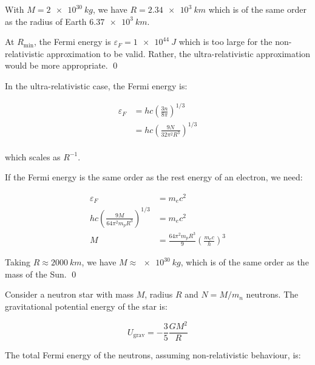 \documentclass[12pt]{article}
\begin{document}
With $M = \qty{2e30}{kg}$, we have $R = \qty{2.34e3}{km}$ which is of the same order as the radius of Earth $\qty{6.37e3}{km}$.

At $R_{\text{min}}$, the Fermi energy is $\varepsilon_{F} = \qty{1e44}{J}$ which is too large for the non-relativistic approximation to be valid. Rather, the ultra-relativistic approximation would be more appropriate.
\qed



In the ultra-relativistic case, the Fermi energy is:

\begin{equation}
    \begin{split}
        \varepsilon_{F} &= h c \left( \frac{3n}{8\pi} \right)^{1/3} \\
        &= hc \left( \frac{9N}{32\pi^{2} R^{3}} \right)^{1/3} \\
    \end{split}
\end{equation}

which scales as $R^{-1}$.

If the Fermi energy is the same order as the rest energy of an electron, we need:

\begin{equation}
    \begin{split}
        \varepsilon_{F} &= m_{e} c^{2} \\
        hc \left( \frac{9M}{64\pi^{2} m_{p} R^{3}} \right)^{1/3} &= m_{e} c^{2} \\
        M &= \frac{64\pi^{2} m_{p} R^{3}}{9} \left( \frac{m_{e} c}{h} \right)^{3}
    \end{split}
\end{equation}

Taking $R \approx \qty{2000}{km}$, we have $M \approx \qty{e30}{kg}$, which is of the same order as the mass of the Sun.
\qed



Consider a neutron star with mass $M$, radius $R$ and $N = M/m_{n}$ neutrons. The gravitational potential energy of the star is:

\begin{equation}
    U_{\text{grav}} = -\frac{3}{5} \frac{GM^{2}}{R}
\end{equation}

The total Fermi energy of the neutrons, assuming non-relativistic behaviour, is:
\end{document}
